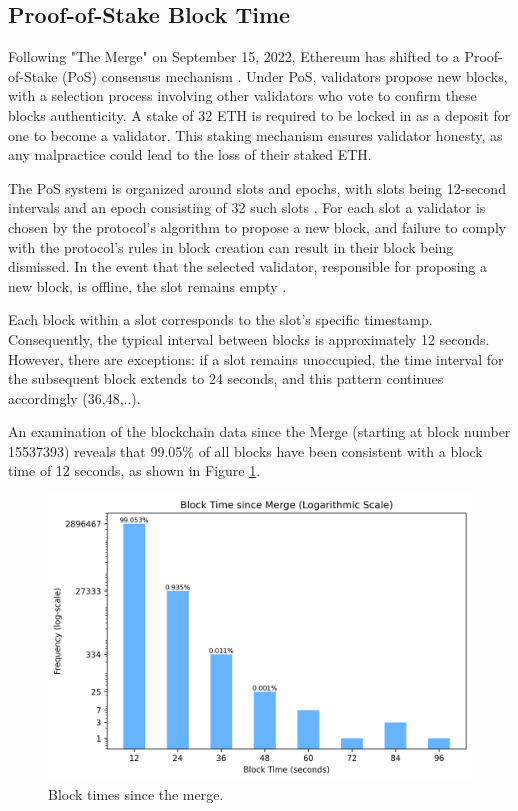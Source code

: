 \subsection{Proof-of-Stake Block Time}
\label{pos_block_time}
Following "The Merge" on September 15, 2022, Ethereum has shifted to a
Proof-of-Stake (PoS) consensus mechanism \cite{eth_history}. Under PoS, validators propose new
blocks, with a selection process involving other validators who vote to confirm
these blocks authenticity. A stake of 32 ETH is required to be locked in as a
deposit for one to become a validator. This staking mechanism ensures validator
honesty, as any malpractice could lead to the loss of their staked ETH.

The PoS system is organized around slots and epochs, with slots being 12-second
intervals and an epoch consisting of 32 such slots
\cite{seconds-per-slot-mainnet}\cite{seconds-per-slot-mainnet-doc}. For each
slot a validator is chosen by the protocol's algorithm to propose a new block,
and failure to comply with the protocol's rules in block creation can result in
their block being dismissed. In the event that the selected validator,
responsible for proposing a new block, is offline, the slot remains empty
\cite{validator-offline}.

Each block within a slot corresponds to the slot's specific timestamp.
Consequently, the typical interval between blocks is approximately 12 seconds.
However, there are exceptions: if a slot remains unoccupied, the time interval
for the subsequent block extends to 24 seconds, and this pattern continues
accordingly (36,48,..).

An examination of the blockchain data since the Merge (starting at block number
15537393) reveals that 99.05\% of all blocks have been consistent with a block
time of 12 seconds, as shown in Figure
\ref{fig:block_time_analysis}.

\begin{figure}[H]
  \centering
  \includegraphics[width=1\textwidth]{block_time_analysis/pos_block_time_bar_chart_with_percentages.png}
  \caption{Block times since the merge.}
  \label{fig:block_time_analysis}
\end{figure}

